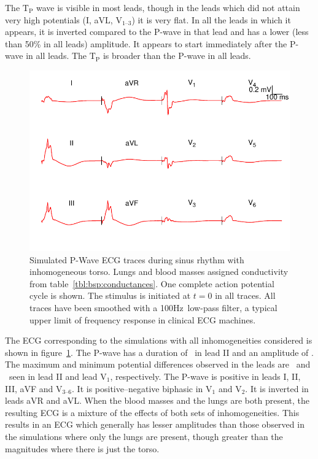 The $\text{T}_{\text{P}}$ wave is
visible in most leads, though in the leads which did not attain very high
potentials (I, aVL, $\text{V}_{\text{1--3}}$) it is very flat.
In all the leads in which it appears, it is inverted compared to the P-wave in
that lead and has a lower (less than 50\% in all leads) amplitude.
It appears to start immediately after the P-wave in all leads.
The $\text{T}_{\text{P}}$ is broader than the P-wave in all leads.

\begin{figure}
\includegraphics{figures/bsp/ecg_all}
\caption[12 lead ECG during sinus rhythm, all internal inhomogeneities present.]{
\label{bsp:fig:ecg_all}
Simulated P-Wave ECG traces during sinus rhythm with inhomogeneous torso.
Lungs and blood masses assigned conductivity from table~\ref{tbl:bsp:conductances}.
One complete action potential cycle is shown.
The stimulus is initiated at $t = 0$ in all traces.
All traces have been smoothed with a \unit{100}{Hz}\ low-pass filter, a typical
upper limit of frequency response in clinical ECG machines.
}
\end{figure}

The ECG corresponding to the simulations with all inhomogeneities considered is shown in
figure~\ref{bsp:fig:ecg_all}.
The P-wave has a duration of \ in lead II and an amplitude of .
The maximum and minimum potential differences observed in the leads are
\ and \ seen in lead II and lead $\text{V}_{\text{1}}$, respectively.
The P-wave is positive in leads I, II, III, aVF and $\text{V}_{\text{3--6}}$.
It is positive--negative biphasic in $\text{V}_{\text{1}}$ and $\text{V}_{\text{2}}$.
It is inverted in leads aVR and aVL.
When the blood masses and the lungs are both present, the resulting ECG is a
mixture of the effects of both sets of inhomogeneities.
This results in an ECG which generally has lesser amplitudes than those observed
in the simulations where only the lungs are present, though greater than the
magnitudes where there is just the torso.

